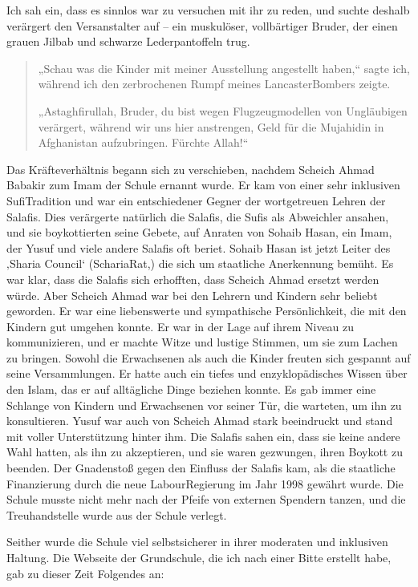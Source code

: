 \documentclass[12pt]{memoir}
\begin{document}
Ich sah ein, dass es sinnlos war zu versuchen mit ihr zu reden,
und suchte deshalb verärgert den Versanstalter auf –
ein muskulöser, vollbärtiger Bruder,
der einen grauen Jilbab und schwarze Lederpantoffeln trug.

\begin{quote}
„Schau was die Kinder mit meiner Ausstellung angestellt haben,“
sagte ich,
während ich den zerbrochenen Rumpf meines Lancaster\–Bombers zeigte.

„Astaghfirullah, Bruder,
du bist wegen Flugzeugmodellen von Ungläubigen verärgert,
während wir uns hier anstrengen,
Geld für die Mujahidin in Afghanistan aufzubringen.
Fürchte Allah!“
\end{quote}

Das Kräfteverhältnis begann sich zu verschieben,
nachdem Scheich Ahmad Babakir zum Imam der Schule ernannt wurde.
Er kam von einer sehr inklusiven Sufi\–Tradition
und war ein entschiedener Gegner der wortgetreuen Lehren der Salafis.
Dies verärgerte natürlich die Salafis, die Sufis als Abweichler ansahen,
und sie boykottierten seine Gebete, auf Anraten von Sohaib Hasan,
ein Imam, der Yusuf und viele andere Salafis oft beriet.
Sohaib Hasan ist jetzt Leiter des ‚Sharia Council‘ (Scharia\–Rat,)
die sich um staatliche Anerkennung bemüht.
Es war klar, dass die Salafis sich erhofften,
dass Scheich Ahmad ersetzt werden würde.
Aber Scheich Ahmad war bei den Lehrern und Kindern sehr beliebt geworden.
Er war eine liebenswerte und sympathische Persönlichkeit,
die mit den Kindern gut umgehen konnte.
Er war in der Lage auf ihrem Niveau zu kommunizieren,
und er machte Witze und lustige Stimmen, um sie zum Lachen zu bringen.
Sowohl die Erwachsenen als auch die Kinder
freuten sich gespannt auf seine Versammlungen.
Er hatte auch ein tiefes und enzyklopädisches Wissen über den Islam,
das er auf alltägliche Dinge beziehen konnte.
Es gab immer eine Schlange von Kindern und Erwachsenen vor seiner Tür,
die warteten, um ihn zu konsultieren.
Yusuf war auch von Scheich Ahmad stark beeindruckt
und stand mit voller Unterstützung hinter ihm.
Die Salafis sahen ein, dass sie keine andere Wahl hatten,
als ihn zu akzeptieren, und sie waren gezwungen, ihren Boykott zu beenden.
Der Gnadenstoß gegen den Einfluss der Salafis kam,
als die staatliche Finanzierung durch
die neue Labour\–Regierung im Jahr 1998 gewährt wurde.
Die Schule musste nicht mehr nach der Pfeife von externen Spendern tanzen,
und die Treuhandstelle wurde aus der Schule verlegt.

Seither wurde die Schule viel selbstsicherer
in ihrer moderaten und inklusiven Haltung.
Die Webseite der Grundschule, die ich nach einer Bitte erstellt habe,
gab zu dieser Zeit Folgendes an:
\end{document}
